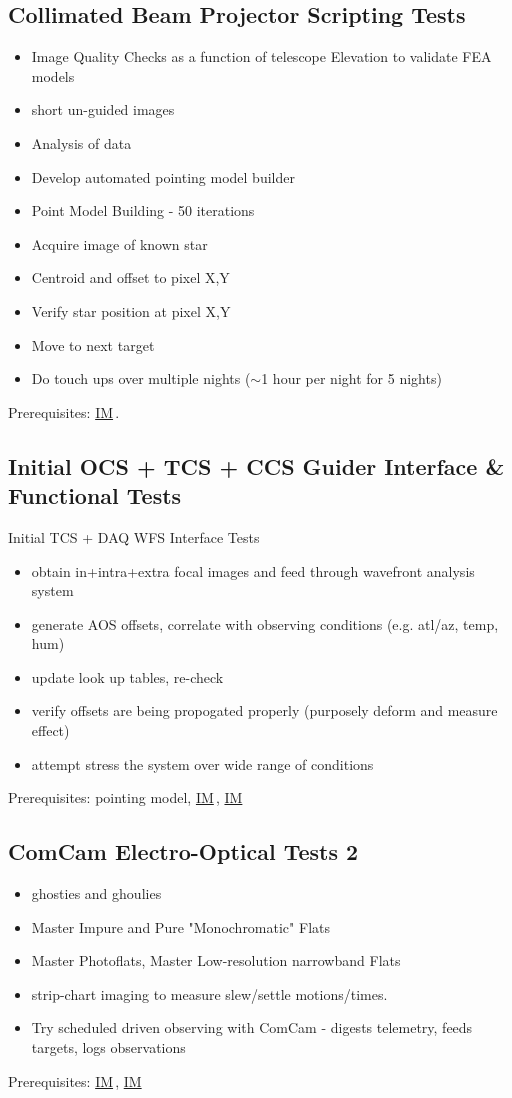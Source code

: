 \documentclass[SE,authoryear,toc]{lsstdoc}
\newcommand{\IM}[1]{\hyperref[IM:#1]{\color{blue}IM$_{\text{\csname nameIM#1\endcsname}}$}\gdef\thisIM{#1}}
\begin{document}
\subsection{Collimated Beam Projector Scripting Tests}

\begin{itemize}
\item Image Quality Checks as a function of telescope Elevation to validate FEA models
\item short un-guided images
\item Analysis of data
\item Develop automated pointing model builder
\item Point Model Building - 50 iterations
\item Acquire image of known star
\item Centroid and offset to pixel X,Y
\item Verify star position at pixel X,Y
\item Move to next target
\item Do touch ups over multiple nights ($\sim$1 hour per night for 5 nights)
\end{itemize}
Prerequisites: \IM{cbp}.

\subsection{Initial OCS + TCS + CCS Guider Interface \& Functional Tests}

Initial TCS + DAQ WFS Interface Tests
\begin{itemize}
\item obtain in+intra+extra focal images and feed through wavefront analysis system
\item generate AOS offsets, correlate with observing conditions (e.g. atl/az, temp, hum)
\item update look up tables, re-check
\item verify offsets are being propogated properly (purposely deform and measure effect)
\item attempt stress the system over wide range of conditions
\end{itemize}
Prerequisites: pointing model, \IM{b}, \IM{g}

\subsection{ComCam Electro-Optical Tests 2}

\begin{itemize}
\item ghosties and ghoulies
\item Master Impure and Pure "Monochromatic" Flats
\item Master Photoflats, Master Low-resolution narrowband Flats
\item strip-chart imaging to measure slew/settle motions/times.
\item Try scheduled driven observing with ComCam - digests telemetry, feeds targets, logs observations
\end{itemize}
Prerequisites: \IM{b}, \IM{g}
\end{document}
